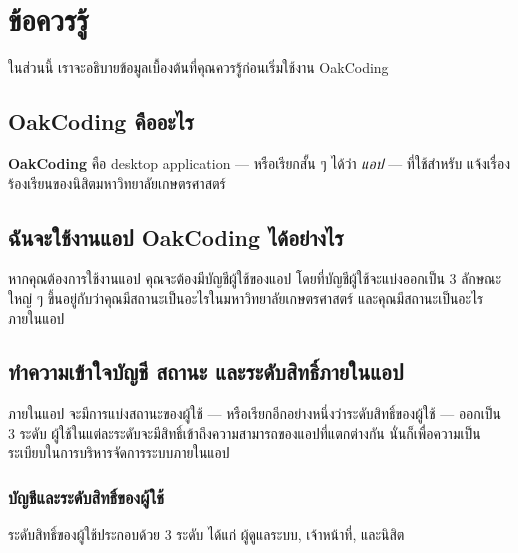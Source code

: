 \section*{ข้อควรรู้}

ในส่วนนี้ เราจะอธิบายข้อมูลเบื้องต้นที่คุณควรรู้ก่อนเริ่มใช้งาน OakCoding

\rule{0em}{1ex}
\subsection*{OakCoding คืออะไร}
\textbf{OakCoding} คือ desktop application --- หรือเรียกสั้น ๆ ได้ว่า \emph{แอป} --- ที่ใช้สำหรับ
แจ้งเรื่องร้องเรียนของนิสิตมหาวิทยาลัยเกษตรศาสตร์

\rule{0em}{1ex}
\subsection*{ฉันจะใช้งานแอป OakCoding ได้อย่างไร}
หากคุณต้องการใช้งานแอป คุณจะต้องมีบัญชีผู้ใช้ของแอป โดยที่บัญชีผู้ใช้จะแบ่งออกเป็น 3 ลักษณะใหญ่ ๆ ขึ้นอยู่กับว่าคุณมีสถานะเป็นอะไรในมหาวิทยาลัยเกษตรศาสตร์
และคุณมีสถานะเป็นอะไรภายในแอป

\rule{0em}{1ex}
\subsection*{ทำความเข้าใจบัญชี สถานะ และระดับสิทธิ์ภายในแอป}
ภายในแอป จะมีการแบ่งสถานะของผู้ใช้ --- หรือเรียกอีกอย่างหนึ่งว่าระดับสิทธิ์ของผู้ใช้ --- ออกเป็น 3 ระดับ
ผู้ใช้ในแต่ละระดับจะมีสิทธิ์เข้าถึงความสามารถของแอปที่แตกต่างกัน นั่นก็เพื่อความเป็นระเบียบในการบริหารจัดการระบบภายในแอป

\newpage

\subsubsection*{บัญชีและระดับสิทธิ์ของผู้ใช้}
ระดับสิทธิ์ของผู้ใช้ประกอบด้วย 3 ระดับ  ได้แก่ ผู้ดูแลระบบ, เจ้าหน้าที่, และนิสิต


